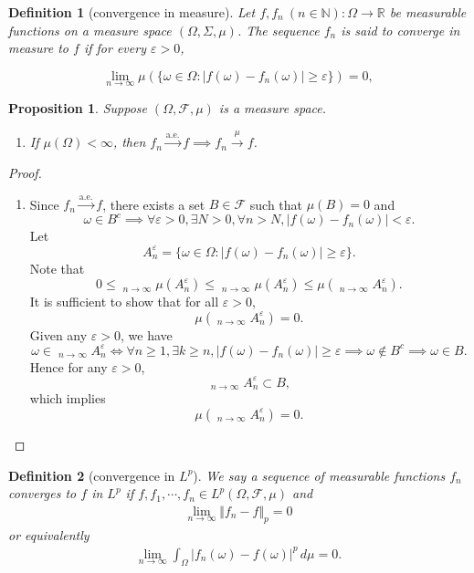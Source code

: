 \documentclass{report}
\newtheorem{definition}{Definition}[section]
\newtheorem{proposition}{Proposition}[section]
\theoremstyle{nonumberplain}
\newtheorem{proof}{Proof.}
\DeclareMathOperator*\lowlim{\underline{lim}}
\DeclareMathOperator*\uplim{\overline{lim}}
\begin{document}
\begin{definition}[convergence in measure]
	Let $f,f_{n}\ (n\in {\mathbb  N}):\Omega\to {\mathbb  R}$ be measurable functions on a measure space $(\Omega,\Sigma ,\mu )$. The sequence $ f_{n}$ is said to converge in measure to $f$ if for every $\varepsilon >0$,
	
	$$\lim_{{n\to \infty }}\mu \left(\{\omega\in \Omega:|f(\omega)-f_{n}(\omega)|\geq \varepsilon \}\right)=0,$$
\end{definition}

\begin{proposition}
	Suppose $(\Omega,\mathcal{F},\mu)$ is a measure space.
	\begin{enumerate}
		\item If $\mu(\Omega)<\infty$, then $f_n\xrightarrow{\text{a.e.}}f\implies f_n\xrightarrow{\mu}f$.
	\end{enumerate}
\end{proposition}
\begin{proof}
	\begin{enumerate}
		\item 
		Since $f_n\xrightarrow{\text{a.e.}}f$, there exists a set $B\in\mathcal{F}$ such that $\mu(B)=0$ and
		\[
			\omega\in B^c\implies\forall\varepsilon>0,\exists N>0,\forall n>N,|f(\omega)-f_n(\omega)|<\varepsilon.
		\]
		Let 
		\[
			A_n^\varepsilon = \{\omega\in \Omega:|f(\omega)-f_{n}(\omega)|\geq \varepsilon \}.
		\]
		Note that
		\[
			0\le\lowlim_{n\to\infty}\mu\left(A_{n}^\varepsilon\right)\le\uplim_{n\to\infty} \mu\left(A_{n}^\varepsilon\right)\le\mu\left(\uplim_{n\to\infty} A_{n}^\varepsilon\right).
		\]
		It is sufficient to show that for all $\varepsilon>0$,
		\[
			\mu\left(\uplim_{n\to\infty} A_{n}^\varepsilon\right)=0.
		\]
		Given any $\varepsilon>0$, we have
		\[
			\omega\in\uplim_{n\to\infty} A_{n}^\varepsilon\iff\forall n\ge1,\exists k\ge n,|f(\omega)-f_{n}(\omega)|\geq \varepsilon\implies\omega\notin B^c\implies \omega \in B.
		\]
		Hence for any $\varepsilon>0$,
		\[
			\uplim_{n\to\infty} A_{n}^\varepsilon\subset B,
		\]
		which implies 
		\[
			\mu\left(\uplim_{n\to\infty} A_{n}^\varepsilon\right)=0.
		\]
	\end{enumerate}
\end{proof}

\begin{definition}[convergence in $L^p$]
	We say a sequence of measurable functions $f_n$ converges to $f$ in $L^p$ if $f,f_1,\cdots,f_n\in L^p(\Omega, \mathcal{F}, \mu)$ and
	\begin{align*}
		\lim_{n\to\infty}\Vert f_n-f\Vert_p=0
	\end{align*}
	or equivalently
	\begin{align*}
		\lim_{n\to\infty}\int_{\Omega}|f_n(\omega)-f(\omega)|^p\,d\mu=0.
	\end{align*}
\end{definition}
\end{document}
